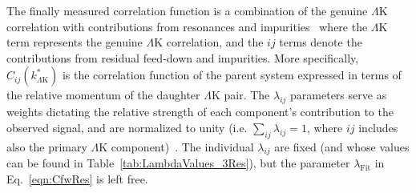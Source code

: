 \documentclass[ALICE,manyauthors]{cernphprep}
\newcommand{\LamK}{$\Lambda$K\xspace}
\begin{document}
The finally measured correlation function is a combination of the genuine \LamK correlation with contributions from resonances and impurities~\cite{Kisiel:2014mma}{\color{blue}{,}}
{}
{}
where the \LamK term represents the genuine \LamK correlation, and the $ij$ terms denote the contributions from residual feed-down and impurities.
More specifically, $C_{ij}(k^{*}_{\Lambda\mathrm{K}})$ is the correlation function of the parent system expressed in terms of the relative momentum of the daughter \LamK pair.  
The $\lambda_{ij}$ parameters serve as weights dictating the relative strength of each component's contribution to the observed signal, and are normalized to unity (i.e.{\color{blue}{,}} $\sum_{ij} \lambda_{ij} = 1$, where $ij$ includes also the primary \LamK component)~\cite{Kisiel:2014mma, Acharya:2018gyz}.
The individual $\lambda_{ij}$ are fixed (and whose values can be found in Table~\ref{tab:LambdaValues_3Res}), but the parameter $\lambda_{\mathrm{Fit}}$ in Eq.~\ref{eqn:CfwRes} is left free.
\end{document}
